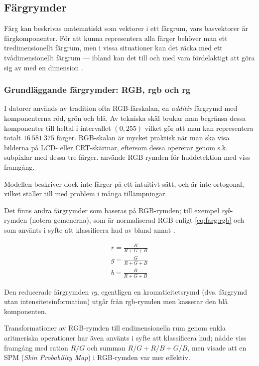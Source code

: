\documentclass[../rapport_MVEX01-11-05]{subfiles}
\begin{document}
\subsection{Färgrymder}

Färg kan beskrivas matematiskt som vektorer i ett färgrum, vars
basvektorer är färgkomponenter. För att kunna representera alla färger
behöver man ett tredimensionellt färgrum, men i vissa situationer kan
det räcka med ett tvådimensionellt färgrum --- ibland kan det till och
med vara fördelaktigt att göra sig av med en dimension \cite{Kakumanu07}.

\subsubsection{Grundläggande färgrymder: RGB, rgb och rg}

I datorer används av tradition ofta RGB-färskalan, en \emph{additiv}
färgrymd med komponenterna röd, grön och blå. Av tekniska skäl brukar
man begränsa dessa komponenter till heltal i intervallet $(0,255)$
vilket gör att man kan representera totalt $16\:581\:375$ färger.
RGB-skalan är mycket praktisk när man ska visa bilderna på LCD- eller
CRT-skärmar, eftersom dessa opererar genom s.k. subpixlar med dessa
tre färger.  använde RGB-rymden för huddetektion
med viss framgång.

Modellen beskriver dock inte färger på ett intuitivt sätt, och är inte
ortogonal, vilket ställer till med problem i många tillämpningar.

Det finns andra färgrymder som baseras på RGB-rymden; till exempel
\emph{rgb}-rymden (notera gemenerna), som är normaliserad RGB enligt
\eqref{eq:farg:rgb} och som använts i syfte att klassificera hud av bland
annat .

\begin{equation}
  \label{eq:farg:rgb}
  \begin{gathered}
  r = \frac{R}{R+G+B} \\
  g = \frac{G}{R+G+B} \\
  b = \frac{B}{R+G+B}
  \end{gathered}
\end{equation}

Den reducerade färgrymden \emph{rg}, egentligen en kromaticitetsrymd
(dvs. färgrymd utan intensitetsinformation) utgår från rgb-rymden men
kasserar den blå komponenten.

Transformationer av RGB-rymden till endimensionella rum genom enkla
aritmeriska operationer har även använts i syfte att klassificera hud;
 nådde viss framgång med ration $R/G$ och summan
$R/G+R/B+G/B$, men visade att en SPM (\emph{Skin Probability Map}) i
RGB-rymden var mer effektiv.
\end{document}

